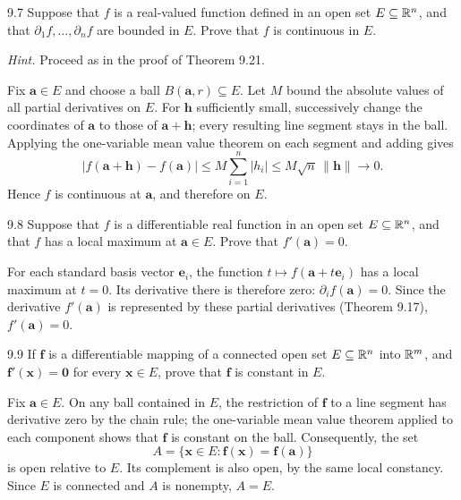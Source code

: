 \documentclass[11pt,oneside]{article}
\begin{document}
\begin{exercise}{9.7}
Suppose that $f$ is a real-valued function defined in an open set $E\subseteq\mathbb{R}^n$, and that $\partial_1f,\ldots,\partial_nf$ are bounded in $E$. Prove that $f$ is continuous in $E$.

\textit{Hint.} Proceed as in the proof of Theorem 9.21.
\end{exercise}
\begin{solution}
Fix $\mathbf a\in E$ and choose a ball $B(\mathbf a,r)\subseteq E$. Let $M$ bound the absolute values of all partial derivatives on $E$. For $\mathbf h$ sufficiently small, successively change the coordinates of $\mathbf a$ to those of $\mathbf a+\mathbf h$; every resulting line segment stays in the ball. Applying the one-variable mean value theorem on each segment and adding gives
\[
 |f(\mathbf a+\mathbf h)-f(\mathbf a)|
 \le M\sum_{i=1}^n|h_i|
 \le M\sqrt n\,\|\mathbf h\|\longrightarrow0.
\]
Hence $f$ is continuous at $\mathbf a$, and therefore on $E$.
\end{solution}

\begin{exercise}{9.8}
Suppose that $f$ is a differentiable real function in an open set $E\subseteq\mathbb{R}^n$, and that $f$ has a local maximum at $\mathbf a\in E$. Prove that $f'(\mathbf a)=0$.
\end{exercise}
\begin{solution}
For each standard basis vector $\mathbf e_i$, the function $t\mapsto f(\mathbf a+t\mathbf e_i)$ has a local maximum at $t=0$. Its derivative there is therefore zero: $\partial_i f(\mathbf a)=0$. Since the derivative $f'(\mathbf a)$ is represented by these partial derivatives (Theorem 9.17), $f'(\mathbf a)=0$.
\end{solution}

\begin{exercise}{9.9}
If $\mathbf f$ is a differentiable mapping of a connected open set $E\subseteq\mathbb{R}^n$ into $\mathbb{R}^m$, and $\mathbf f'(\mathbf x)=\mathbf 0$ for every $\mathbf x\in E$, prove that $\mathbf f$ is constant in $E$.
\end{exercise}
\begin{solution}
Fix $\mathbf a\in E$. On any ball contained in $E$, the restriction of $\mathbf f$ to a line segment has derivative zero by the chain rule; the one-variable mean value theorem applied to each component shows that $\mathbf f$ is constant on the ball. Consequently, the set
\[
 A=\{\mathbf x\in E:\mathbf f(\mathbf x)=\mathbf f(\mathbf a)\}
\]
is open relative to $E$. Its complement is also open, by the same local constancy. Since $E$ is connected and $A$ is nonempty, $A=E$.
\end{solution}
\end{document}

